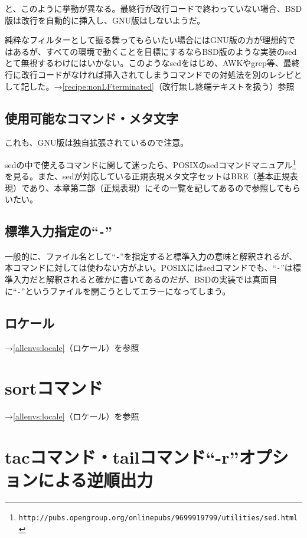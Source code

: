 と、このように挙動が異なる。最終行が改行コードで終わっていない場合、BSD版は改行を自動的に挿入し、GNU版はしないようだ。

純粋なフィルターとして振る舞ってもらいたい場合にはGNU版の方が理想的ではあるが、すべての環境で動くことを目標にするならBSD版のような実装のsedとて無視するわけにはいかない。このようなsedをはじめ、AWKやgrep等、最終行に改行コードがなければ挿入されてしまうコマンドでの対処法を別のレシピとして記した。→\ref{recipe:nonLFterminated}（改行無し終端テキストを扱う）参照

\subsection*{使用可能なコマンド・メタ文字}

これも、GNU版は独自拡張されているので注意。

sedの中で使えるコマンドに関して迷ったら、POSIXのsedコマンドマニュアル\footnote{\verb|http://pubs.opengroup.org/onlinepubs/9699919799/utilities/sed.html|}を見る。また、sedが対応している正規表現メタ文字セットはBRE（基本正規表現）であり、本章第二部（正規表現）にその一覧を記してあるので参照してもらいたい。

\subsection*{標準入力指定の``\verb|-|''}

一般的に、ファイル名として``\verb|-|''を指定すると標準入力の意味と解釈されるが、本コマンドに対しては使わない方がよい。POSIXにはsedコマンドでも、``\verb|-|''は標準入力だと解釈されると確かに書いてあるのだが、BSDの実装では真面目に``\verb|-|''というファイルを開こうとしてエラーになってしまう。

\subsection*{ロケール}

\noindent
→\ref{allenvs:locale}（ロケール）を参照

\section{sortコマンド}

\noindent
→\ref{allenvs:locale}（ロケール）を参照

\section{tacコマンド・tailコマンド``-r''オプションによる逆順出力}


